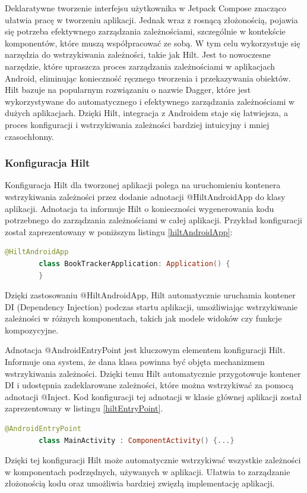 \documentclass[12pt,twoside]{article}
\begin{document}
Deklaratywne tworzenie interfejsu użytkownika w Jetpack Compose znacząco ułatwia pracę w tworzeniu aplikacji. Jednak
wraz z rosnącą złożonością, pojawia się potrzeba efektywnego zarządzania zależnościami, szczególnie w kontekście 
komponentów, które muszą współpracować ze sobą. W tym celu wykorzystuje się narzędzia do wstrzykiwania zależności, 
takie jak Hilt. Jest to nowoczesne narzędzie, które upraszcza proces zarządzania zależnościami w aplikacjach Android, 
eliminując konieczność ręcznego tworzenia i przekazywania obiektów. Hilt bazuje na popularnym rozwiązaniu o nazwie 
Dagger, które jest wykorzystywane do automatycznego i efektywnego zarządzania zależnościami w dużych aplikacjach. 
Dzięki Hilt, integracja z Androidem staje się łatwiejsza, a proces konfiguracji i wstrzykiwania zależności bardziej 
intuicyjny i mniej czasochłonny.

\subsubsection{Konfiguracja Hilt}

Konfiguracja Hilt dla tworzonej aplikacji polega na uruchomieniu kontenera wstrzykiwania zależności przez dodanie 
adnotacji @HiltAndroidApp do klasy aplikacji. Adnotacja ta informuje Hilt o konieczności wygenerowania kodu 
potrzebnego do zarządzania zależnościami w całej aplikacji. Przykład konfiguracji został zaprezentowany w poniższym 
listingu \ref{hiltAndroidApp}:

\begin{lstlisting}[language=Kotlin,caption=Konfiguracja Hilt w aplikacji, label={hiltAndroidApp}]
	@HiltAndroidApp
		class BookTrackerApplication: Application() {
		}
\end{lstlisting}
Dzięki zastosowaniu @HiltAndroidApp, Hilt automatycznie uruchamia kontener DI (Dependency Injection) podczas startu 
aplikacji, umożliwiając wstrzykiwanie zależności w różnych komponentach, takich jak modele widoków czy funkcje 
kompozycyjne.

Adnotacja @AndroidEntryPoint jest kluczowym elementem konfiguracji Hilt. Informuje ona system, że dana klasa 
powinna być objęta mechanizmem wstrzykiwania zależności. Dzięki temu Hilt automatycznie przygotowuje kontener DI i 
udostępnia zadeklarowane zależności, które można wstrzykiwać za pomocą adnotacji @Inject. Kod konfiguracji tej 
adnotacji w klasie głównej aplikacji został zaprezentowany w listingu \ref{hiltEntryPoint}.
\begin{lstlisting}[language=Kotlin,caption=Przykład użycia @AndroidEntryPoint w MainActivity, label={hiltEntryPoint}]
	@AndroidEntryPoint
		class MainActivity : ComponentActivity() {...}
\end{lstlisting}
Dzięki tej konfiguracji Hilt może automatycznie wstrzykiwać wszystkie zależności w komponentach podrzędnych, 
używanych w aplikacji. Ułatwia to zarządzanie złożonością kodu oraz umożliwia bardziej zwięzłą implementację 
aplikacji.
\end{document}
